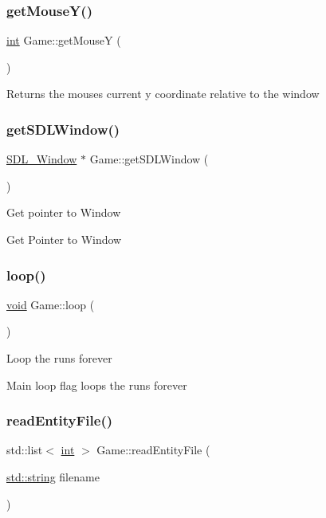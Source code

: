 \subsubsection{\texorpdfstring{getMouseY()}{getMouseY()}}
{\footnotesize\ttfamily \mbox{\hyperlink{warnings_8h_a74f207b5aa4ba51c3a2ad59b219a423b}{int}} Game\+::get\+MouseY (\begin{DoxyParamCaption}{ }\end{DoxyParamCaption})}

Returns the mouse\textquotesingle{}s current y coordinate relative to the window \mbox{\label{class_game_a42abcdfd6a9f87b50ea47315304c7b33}} 
\subsubsection{\texorpdfstring{getSDLWindow()}{getSDLWindow()}}
{\footnotesize\ttfamily \mbox{\hyperlink{_s_d_l__video_8h_a55a196c7d3b8497538632c79ae1e6392}{S\+D\+L\+\_\+\+Window}} $\ast$ Game\+::get\+S\+D\+L\+Window (\begin{DoxyParamCaption}{ }\end{DoxyParamCaption})}

Get pointer to Window

Get Pointer to Window \mbox{\label{class_game_a7ad92b77b596d7882a7ae76eb18b5e6c}} 
\subsubsection{\texorpdfstring{loop()}{loop()}}
{\footnotesize\ttfamily \mbox{\hyperlink{_s_d_l__opengles2__gl2ext_8h_ae5d8fa23ad07c48bb609509eae494c95}{void}} Game\+::loop (\begin{DoxyParamCaption}{ }\end{DoxyParamCaption})}

Loop the runs forever

Main loop flag loops the runs forever \mbox{\label{class_game_a77336c7c6dcb70b4be0366d3aaac4688}} 
\subsubsection{\texorpdfstring{readEntityFile()}{readEntityFile()}}
{\footnotesize\ttfamily std\+::list$<$ \mbox{\hyperlink{warnings_8h_a74f207b5aa4ba51c3a2ad59b219a423b}{int}} $>$ Game\+::read\+Entity\+File (\begin{DoxyParamCaption}\item[{\mbox{\hyperlink{_s_d_l__opengl__glext_8h_ab4ccfaa8ab0e1afaae94dc96ef52dde1}{std\+::string}}}]{filename }\end{DoxyParamCaption})}

